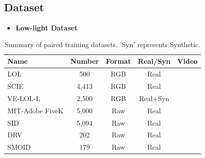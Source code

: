 \documentclass[CJK,aspectratio=169]{beamer}  %
\begin{document}
	\subsection{Dataset}
	
	\begin{frame}
		
		
		\begin{itemize} 
			\item \textbf{Low-light Dataset}
		\end{itemize}
		
		\begin{table}[!htbp]
			\centering
			\tiny
				\begin{tabular}{>{\centering\arraybackslash}m{3cm}|c|c|c|c}
					
					\hline
					
					\textbf{Name} & \textbf{Number} & \textbf{Format} & \textbf{Real/Syn} & \textbf{Video} \\
					
					\hline
					
					LOL\textcolor{blue}{\citep{wei2018deep}} & 500 & RGB & Real & \\
					
					SCIE\textcolor{blue}{\citep{cai2018learning}} & 4,413 & RGB & Real & \\
					
					VE-LOL-L\textcolor{blue}{\citep{jiang2019learning}} & 2,500 & RGB & Real+Syn & \\
					
					MIT-Adobe FiveK\textcolor{blue}{\citep{bychkovsky2011learning}} & 5,000 & Raw & Real & \\
					
					SID\textcolor{blue}{\citep{wei2018deep}} & 5,094 & Raw & Real & \\
					
					DRV\textcolor{blue}{\citep{chen2019seeing}} & 202 & Raw & Real & \checkmark  \\
					
					SMOID\textcolor{blue}{\citep{jiang2019learning}} & 179 & Raw & Real & \checkmark  \\
					
					\hline
					
				\end{tabular}
			\captionsetup{font=scriptsize} %
			\caption{\label{tab: Paired_training_datases}
				Summary of paired training datasets. 'Syn' represents Synthetic.} %
			
		\end{table}
	\end{frame}
	
\end{document}
